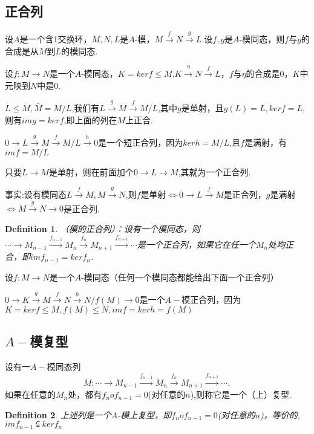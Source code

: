 \documentclass[UTF8]{article}
\newtheorem{defn}{Definition}[section]
\begin{document}
\subsection{正合列}
设$A$是一个含1交换环，$M,N,L$是$A$-模，$M\xrightarrow{f}N\xrightarrow{g}L$.设$f,g$是$A$-模同态，则$f$与$g$的合成是从$M$到$L$的模同态.

设$f:M\rightarrow N$是一个$A$-模同态，$K=kerf\leqslant M$,$K\xrightarrow{\eta}N\xrightarrow{f}L$，$f$与$\eta$的合成是0，$K$中元映到$N$中是0.

$L\leqslant M,\bar{M}=M/L$,我们有$L\xrightarrow{g}M\xrightarrow{f}M/L$,其中$g$是单射，且$g(L)=L,kerf=L$,则有$img=kerf$,即上面的列在$M$上正合.

$0\rightarrow L\xrightarrow{g}M\xrightarrow{f}M/L\xrightarrow{h}0$是一个短正合列，因为$kerh=M/L$,且$f$是满射，有$imf=M/L$

只要$L\rightarrow M$是单射，则在前面加个$0\rightarrow L\rightarrow M$,其就为一个正合列.

事实:设有模同态$L\xrightarrow{f}M,M\xrightarrow{g}N$,则$f$是单射$\Leftrightarrow 0\rightarrow L\xrightarrow{f}M$是正合列，$g$是满射$\Leftrightarrow M\xrightarrow{g}N\rightarrow 0$是正合列.

\begin{defn}
	
（模的正合列）：设有一个模同态，则$\cdots\rightarrow M_{n-1}\xrightarrow{f_{n-1}}M_{n}\xrightarrow{f_{n}} M_{n+1}\xrightarrow{f_{n+1}}\cdots$是一个正合列，如果它在任一个$M_{n}$处均正合，即$imf_{n-1}=kerf_{n}$.
\end{defn}
设$f:M\rightarrow N$是一个$A$-模同态（任何一个模同态都能给出下面一个正合列）

$0\rightarrow K\xrightarrow{g}M\xrightarrow{f}N\xrightarrow{h}N/f(M)\rightarrow 0$是一个$A-$模正合列，因为$K=kerf\leqslant M,f(M)\leqslant N,imf=kerh=f(M)$

\subsection{$A-$模复型}

设有一$A-$模同态列
$$\overline{M}:\cdots\rightarrow M_{n-1}\xrightarrow{f_{n-1}}M_{n}\xrightarrow{f_{n}} M_{n+1}\xrightarrow{f_{n+1}}\cdots,$$
如果在任意的$M_{n}$处，都有$f_{n}of_{n-1}=0$(对任意的$n$),则称它是一个（上）复型.

\begin{defn}
	上述列是一个$A$-模上复型，即$f_{n}of_{n-1}=0$(对任意的$n$)，等价的,$imf_{n-1}\subseteqq kerf_{n}$
\end{defn}
\end{document}
